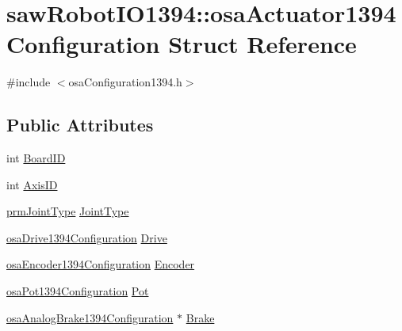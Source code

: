 \hypertarget{structsaw_robot_i_o1394_1_1osa_actuator1394_configuration}{\section{saw\-Robot\-I\-O1394\-:\-:osa\-Actuator1394\-Configuration Struct Reference}
\label{structsaw_robot_i_o1394_1_1osa_actuator1394_configuration}
}


{\ttfamily \#include $<$osa\-Configuration1394.\-h$>$}

\subsection*{Public Attributes}
\begin{DoxyCompactItemize}
\item 
int \hyperlink{structsaw_robot_i_o1394_1_1osa_actuator1394_configuration_a22cc3448ab6886b8b23dd8a16445ad86}{Board\-I\-D}
\item 
int \hyperlink{structsaw_robot_i_o1394_1_1osa_actuator1394_configuration_afef5e3b088b5b6bd63c71e424ac9b48b}{Axis\-I\-D}
\item 
\hyperlink{prm_joint_type_8h_a895942aa22779beb318114dcff38b5af}{prm\-Joint\-Type} \hyperlink{structsaw_robot_i_o1394_1_1osa_actuator1394_configuration_a4f232ffae661ac78270858c1c68c2859}{Joint\-Type}
\item 
\hyperlink{structsaw_robot_i_o1394_1_1osa_drive1394_configuration}{osa\-Drive1394\-Configuration} \hyperlink{structsaw_robot_i_o1394_1_1osa_actuator1394_configuration_aa2c6db368b235c58efb11afa489d9f0e}{Drive}
\item 
\hyperlink{structsaw_robot_i_o1394_1_1osa_encoder1394_configuration}{osa\-Encoder1394\-Configuration} \hyperlink{structsaw_robot_i_o1394_1_1osa_actuator1394_configuration_a9f6160c86aca21cc9024a0b4e8e58453}{Encoder}
\item 
\hyperlink{structsaw_robot_i_o1394_1_1osa_pot1394_configuration}{osa\-Pot1394\-Configuration} \hyperlink{structsaw_robot_i_o1394_1_1osa_actuator1394_configuration_a05332a1631f974de8304f4210e9e33e8}{Pot}
\item 
\hyperlink{structsaw_robot_i_o1394_1_1osa_analog_brake1394_configuration}{osa\-Analog\-Brake1394\-Configuration} $\ast$ \hyperlink{structsaw_robot_i_o1394_1_1osa_actuator1394_configuration_a000517ed63c5bcb3e7ff4f0605c44169}{Brake}
\end{DoxyCompactItemize}


